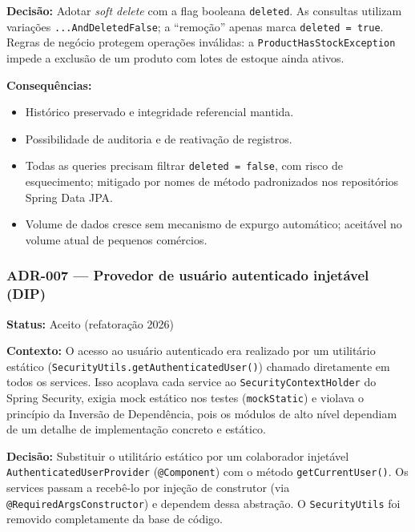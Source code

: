 \documentclass[12pt,a4paper]{article}
\begin{document}
\noindent\textbf{Decisão:}
Adotar \textit{soft delete} com a flag booleana \texttt{deleted}. As consultas utilizam variações \texttt{...AndDeletedFalse}; a ``remoção'' apenas marca \texttt{deleted = true}. Regras de negócio protegem operações inválidas: a \texttt{ProductHasStockException} impede a exclusão de um produto com lotes de estoque ainda ativos.

\noindent\textbf{Consequências:}
\begin{itemize}
    \item[+] Histórico preservado e integridade referencial mantida.
    \item[+] Possibilidade de auditoria e de reativação de registros.
    \item[--] Todas as queries precisam filtrar \texttt{deleted = false}, com risco de esquecimento; mitigado por nomes de método padronizados nos repositórios Spring Data JPA.
    \item[--] Volume de dados cresce sem mecanismo de expurgo automático; aceitável no volume atual de pequenos comércios.
\end{itemize}

\subsubsection{ADR-007 --- Provedor de usuário autenticado injetável (DIP)}

\noindent\textbf{Status:} Aceito (refatoração 2026)

\noindent\textbf{Contexto:}
O acesso ao usuário autenticado era realizado por um utilitário estático (\texttt{SecurityUtils.getAuthenticatedUser()}) chamado diretamente em todos os services. Isso acoplava cada service ao \texttt{SecurityContextHolder} do Spring Security, exigia mock estático nos testes (\texttt{mockStatic}) e violava o princípio da Inversão de Dependência, pois os módulos de alto nível dependiam de um detalhe de implementação concreto e estático.

\noindent\textbf{Decisão:}
Substituir o utilitário estático por um colaborador injetável \texttt{Authenticated\-UserProvider} (\texttt{@Component}) com o método \texttt{getCurrentUser()}. Os services passam a recebê-lo por injeção de construtor (via \texttt{@RequiredArgsConstructor}) e dependem dessa abstração. O \texttt{SecurityUtils} foi removido completamente da base de código.
\end{document}
